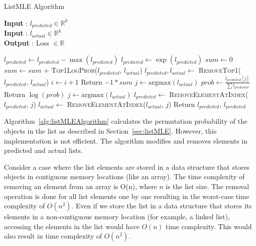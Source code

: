 \documentclass[12pt, twoside, ngerman]{report}
\begin{document}
\begin{algorithm}[h]
\caption{ListMLE Algorithm}
\label{alg:listMLEAlgorithm}
\hspace*{\algorithmicindent} \textbf{Input} : $l_{predicted} \in \mathbb{R}^k$ \\
\hspace*{\algorithmicindent} \textbf{Input} : $l_{actual} \in \mathbb{R}^k$ \\
\hspace*{\algorithmicindent} \textbf{Output} : Loss $\in \mathbb{R}$
\begin{algorithmic}[1]
    \State $l_{predicted} \gets l_{predicted} - \max(l_{predicted})$
    \State $l_{predicted} \gets \exp(l_{predicted})$   
    \State $sum \gets 0$
     
        \State $sum \gets sum$ + \textsc{Top1LogProb}($l_{predicted}$,  $l_{actual}$)
        \State $l_{predicted},  l_{actual} \gets $ \textsc{RemoveTop1}($l_{predicted}$,  $l_{actual}$)
        \State $i \gets i + 1$
    \EndFor
    \State  Return $-1 * sum$     
    \EndProcedure
    \State $j \gets \textrm{argmax}(l_{actual})$
    \State $prob \gets \frac{l_{predicted}[j]}{\sum l_{predicted} }$
    \State  Return $\log(prob)$
    \EndProcedure
    \State $j \gets \textrm{argmax}(l_{actual})$
    \State $l_{predicted} \gets$ \textsc{RemoveElementAtIndex}($l_{predicted}$, $j$)
    \State $l_{actual} \gets$ \textsc{RemoveElementAtIndex}($l_{actual}$, $j$)
    \State  Return $l_{predicted}$,  $l_{predicted}$
    \EndProcedure
\end{algorithmic}
\end{algorithm}

Algorithm~\ref{alg:listMLEAlgorithm} calculates the permutation probability of the objects in the list as described in Section~\ref{sec:listMLE}.
However, this implementation is not efficient.
The algorithm modifies and removes elements in predicted and actual lists.

Consider a case where the list elements are stored in a data structure that stores objects in contiguous memory locations (like an array).
The time complexity of removing an element from an array is O(n), where $n$ is the list size.
The removal operation is done for all list elements one by one resulting in the worst-case time complexity of $O(n^2)$.
Even if we store the list in a data structure that stores its elements in a non-contiguous memory location (for example, a linked list), accessing the elements in the list would have $O(n)$ time complexity. This would also result in time complexity of $O(n^2)$.
\end{document}
